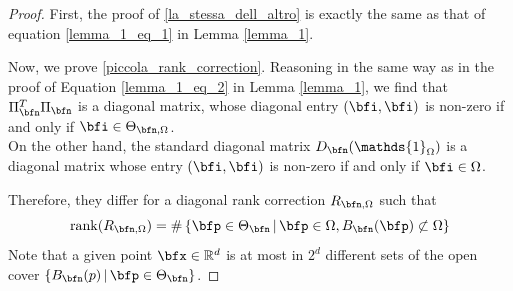 \documentclass{amsart}
\begin{document}
\begin{proof}
    First, the proof of \eqref{la_stessa_dell_altro} is exactly the same as that of equation \eqref{lemma_1_eq_1} in Lemma \ref{lemma_1}.

    Now, we prove \eqref{piccola_rank_correction}. Reasoning in the same way as in the proof of Equation \eqref{lemma_1_eq_2} in Lemma \ref{lemma_1}, we find that $\Pi_{\bfn}^T \Pi_{\bfn}$ is a diagonal matrix, whose diagonal entry $(\bfi,\bfi)$ is non-zero if and only if $\bfi\in\Theta_{\bfn,\Omega}$.\\
    On the other hand, the standard diagonal matrix $D_\bfn(\mathds{1}_{\Omega})$ is a diagonal matrix whose entry $(\bfi,\bfi)$ is non-zero if and only if $\bfi\in\Omega$.
    
     Therefore, they differ for a diagonal rank correction $R_{\bfn,\Omega}$ such that
    \begin{equation*}
        \mathrm{rank}(R_{\bfn,\Omega})=\#\left\{\bfp\in\Theta_\bfn\,\vert\,\bfp\in\Omega,B_\bfn(\bfp)\not\subset\Omega\right\}
    \end{equation*}
    Note that a given point $\bfx\in\mathbb{R}^d$ is at most in $2^d$ different sets of the open cover $\{B_\bfn(p)\,\vert\,\bfp\in\Theta_\bfn\}$.


\end{proof}
\end{document}
